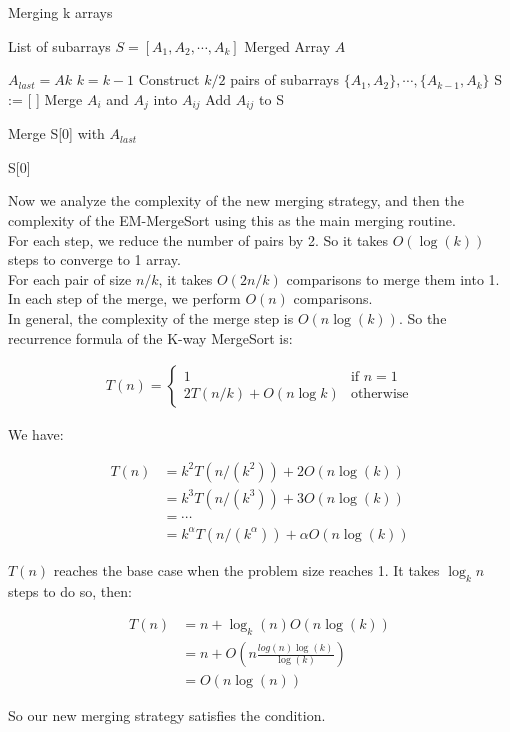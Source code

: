 \begin{algorithm}[h]
  \caption{Merging k arrays}
  \label{alg:merge}
  \begin{algorithmic}
      \Require List of subarrays $S = [A_1, A_2, \cdots, A_k]$
    \Ensure Merged Array $A$

  \State $A_{last} = A{k}$
  \State $k = k - 1$
  \EndIf
  \State Construct $k/2$ pairs of subarrays $\{A_1, A_2\},\cdots, \{A_{k - 1}, A_k\}$
  \State S := [\,\,]
  \State Merge $A_i$ and $A_j$ into $A_{ij}$
  \State Add $A_{ij}$ to S
  \EndFor
  \EndWhile

  \State Merge S[0] with $A_{last}$
  \EndIf

  \Return S[0]
\end{algorithmic}
\end{algorithm}

Now we analyze the complexity of the new merging strategy, and then the complexity of the EM-MergeSort using this as the main merging routine. \\

For each step, we reduce the number of pairs by 2. So it takes $O(\log(k))$ steps to converge to 1 array.\\ 

For each pair of size $n/k$, it takes $O(2n/k)$ comparisons to merge them into 1. In each step of the merge, we perform $O(n)$ comparisons.\\

In general, the complexity of the merge step is $O(n\log(k))$. So the recurrence formula of the K-way MergeSort is:

\begin{align*}
	T(n) = \begin{cases}
	    1& \text{if } n = 1\\
        2T(n/k)+O(n\log{k})              & \text{otherwise}
	\end{cases}
\end{align*}

We have:

\begin{align*}
    T(n) &= k^2 T(n/(k^2)) + 2O(n\log(k)) \\
    &= k^3 T(n/(k^3)) + 3O(n\log(k)) \\
    &= \cdots \\
    &= k^\alpha T(n/(k^\alpha)) + \alpha O(n\log(k))
\end{align*}

$T(n)$ reaches the base case when the problem size reaches 1. It takes $\log_k n$ steps to do so, then:

\begin{align*}
T(n) &= n + \log_k(n) O(n\log(k)) \\
        &= n + O(n\frac{log(n)\log(k)}{\log(k)}) \\
        &= O(n\log(n))
\end{align*}

So our new merging strategy satisfies the condition.

